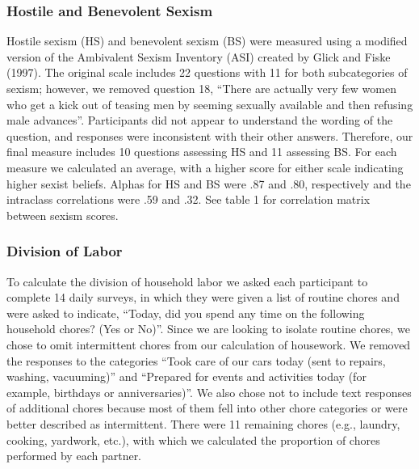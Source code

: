\documentclass[
  man]{apa6}
\begin{document}
\hypertarget{hostile-and-benevolent-sexism}{%
\subsubsection{Hostile and Benevolent Sexism}\label{hostile-and-benevolent-sexism}}

Hostile sexism (HS) and benevolent sexism (BS) were measured using a modified version of the Ambivalent Sexism Inventory (ASI) created by Glick and Fiske (1997). The original scale includes 22 questions with 11 for both subcategories of sexism; however, we removed question 18, ``There are actually very few women who get a kick out of teasing men by seeming sexually available and then refusing male advances''. Participants did not appear to understand the wording of the question, and responses were inconsistent with their other answers. Therefore, our final measure includes 10 questions assessing HS and 11 assessing BS. For each measure we calculated an average, with a higher score for either scale indicating higher sexist beliefs. Alphas for HS and BS were .87 and .80, respectively and the intraclass correlations were .59 and .32. See table 1 for correlation matrix between sexism scores.

\hypertarget{division-of-labor}{%
\subsubsection{Division of Labor}\label{division-of-labor}}

To calculate the division of household labor we asked each participant to complete 14 daily surveys, in which they were given a list of routine chores and were asked to indicate, ``Today, did you spend any time on the following household chores? (Yes or No)''. Since we are looking to isolate routine chores, we chose to omit intermittent chores from our calculation of housework. We removed the responses to the categories ``Took care of our cars today (sent to repairs, washing, vacuuming)'' and ``Prepared for events and activities today (for example, birthdays or anniversaries)''. We also chose not to include text responses of additional chores because most of them fell into other chore categories or were better described as intermittent. There were 11 remaining chores (e.g., laundry, cooking, yardwork, etc.), with which we calculated the proportion of chores performed by each partner.
\end{document}
